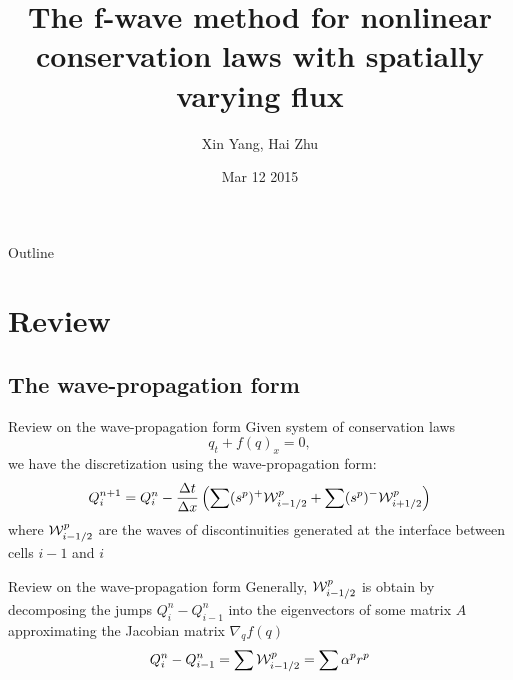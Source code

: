 \documentclass{beamer}
\title%
{The f-wave method for nonlinear conservation laws with spatially varying flux}
\author%
{Xin Yang, Hai Zhu}
\institute[University of Washington] %
{
  Course project for Amath 574\\
  Department of Applied Mathematics\\
  University of Washington
}
\date[03/12/2015] %
{Mar 12 2015}
\begin{document}
\begin{frame}
  \titlepage
\end{frame}

\begin{frame}{Outline}
  \tableofcontents
\end{frame}





\section{Review}
\subsection{The wave-propagation form}
\begin{frame}{Review on the wave-propagation form}
Given system of conservation laws
\[
q_t+f(q)_x=0,
\]
we have the discretization using the wave-propagation form:
\[
Q^{n+1}_i=Q^{n}_i-\frac{\Delta t}{\Delta x}\left(\sum (s^p)^+{\cal W}_{i-1/2}^p+\sum (s^p)^-{\cal W}_{i+1/2}^p\right)
\]
where ${\cal W}^p_{i-1/2}$ are the waves of discontinuities generated at the interface between cells $i-1$ and $i$
\end{frame}
\begin{frame}{Review on the wave-propagation form}
Generally, ${\cal W}^p_{i-1/2}$ is obtain by decomposing the jumps $Q_i^n-Q_{i-1}^n$ into the eigenvectors of some matrix $A$ approximating the Jacobian matrix $ \nabla_q f(q) $
\[
Q_i^n-Q_{i-1}^n=\sum {\cal W}^p_{i-1/2}=\sum \alpha^p r^p
\]
\end{frame}
\end{document}
